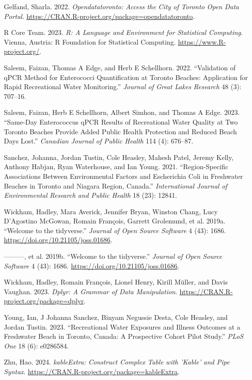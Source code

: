\documentclass[
  letterpaper,
  DIV=11,
  numbers=noendperiod]{scrartcl}
\newlength{\cslhangindent}
\newenvironment{CSLReferences}[2] %
 {\begin{list}{}{%
  \setlength{\itemindent}{0pt}
  \setlength{\leftmargin}{0pt}
  \setlength{\parsep}{0pt}
  \ifodd #1
   \setlength{\leftmargin}{\cslhangindent}
   \setlength{\itemindent}{-1\cslhangindent}
  \fi
  \setlength{\itemsep}{#2\baselineskip}}}
 {\end{list}}
\begin{document}
\label{refs}
\begin{CSLReferences}{1}{0}
Gelfand, Sharla. 2022. \emph{Opendatatoronto: Access the City of Toronto
Open Data Portal}.
\url{https://CRAN.R-project.org/package=opendatatoronto}.

R Core Team. 2023. \emph{R: A Language and Environment for Statistical
Computing}. Vienna, Austria: R Foundation for Statistical Computing.
\url{https://www.R-project.org/}.

Saleem, Faizan, Thomas A Edge, and Herb E Schellhorn. 2022.
{``Validation of qPCR Method for Enterococci Quantification at Toronto
Beaches: Application for Rapid Recreational Water Monitoring.''}
\emph{Journal of Great Lakes Research} 48 (3): 707--16.

Saleem, Faizan, Herb E Schellhorn, Albert Simhon, and Thomas A Edge.
2023. {``Same-Day Enterococcus qPCR Results of Recreational Water
Quality at Two Toronto Beaches Provide Added Public Health Protection
and Reduced Beach Days Lost.''} \emph{Canadian Journal of Public Health}
114 (4): 676--87.

Sanchez, Johanna, Jordan Tustin, Cole Heasley, Mahesh Patel, Jeremy
Kelly, Anthony Habjan, Ryan Waterhouse, and Ian Young. 2021.
{``Region-Specific Associations Between Environmental Factors and
Escherichia Coli in Freshwater Beaches in Toronto and Niagara Region,
Canada.''} \emph{International Journal of Environmental Research and
Public Health} 18 (23): 12841.

Wickham, Hadley, Mara Averick, Jennifer Bryan, Winston Chang, Lucy
D'Agostino McGowan, Romain François, Garrett Grolemund, et al. 2019a.
{``Welcome to the {tidyverse}.''} \emph{Journal of Open Source Software}
4 (43): 1686. \url{https://doi.org/10.21105/joss.01686}.

---------, et al. 2019b. {``Welcome to the {tidyverse}.''} \emph{Journal
of Open Source Software} 4 (43): 1686.
\url{https://doi.org/10.21105/joss.01686}.

Wickham, Hadley, Romain François, Lionel Henry, Kirill Müller, and Davis
Vaughan. 2023. \emph{Dplyr: A Grammar of Data Manipulation}.
\url{https://CRAN.R-project.org/package=dplyr}.

Young, Ian, J Johanna Sanchez, Binyam Negussie Desta, Cole Heasley, and
Jordan Tustin. 2023. {``Recreational Water Exposures and Illness
Outcomes at a Freshwater Beach in Toronto, Canada: A Prospective Cohort
Pilot Study.''} \emph{PLoS One} 18 (6): e0286584.

Zhu, Hao. 2024. \emph{kableExtra: Construct Complex Table with 'Kable'
and Pipe Syntax}. \url{https://CRAN.R-project.org/package=kableExtra}.

\end{CSLReferences}
\end{document}
